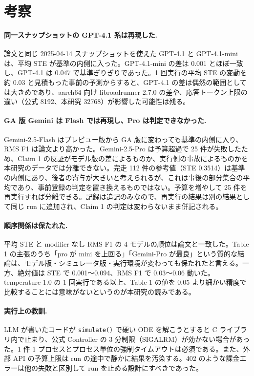 \documentclass{article}
\providecommand{\unverified}[1]{#1}
\begin{document}


\section{考察}
\label{sec:discussion}
\paragraph{同一スナップショットの GPT-4.1 系は再現した.}
論文と同じ 2025-04-14 スナップショットを使えた GPT-4.1 と GPT-4.1-mini は、平均 STE が基準の内側に入った。GPT-4.1-mini の差は 0.001 とほぼ一致し、GPT-4.1 は 0.047 で基準ぎりぎりであった。1 回実行の平均 STE の変動を約 0.03 と見積もった事前の予測からすると、GPT-4.1 の差は偶然の範囲としては大きめであり、aarch64 向け libroadrunner 2.7.0 の差や、応答トークン上限の違い（公式 8192、本研究 32768）が影響した可能性は残る。

\paragraph{GA 版 Gemini は Flash では再現し、Pro は判定できなかった.}
Gemini-2.5-Flash はプレビュー版から GA 版に変わっても基準の内側に入り、RMS F1 は論文より高かった。Gemini-2.5-Pro は予算超過で 25 件が失敗したため、Claim 1 の反証がモデル版の差によるものか、実行側の事故によるものかを本研究のデータでは分離できない。完走 112 件の参考値（STE \unverified{0.3514}）は基準の内側にあり、後者の寄与が大きいと考えられるが、これは事後の部分集合の平均であり、事前登録の判定を置き換えるものではない。予算を増やして 25 件を再実行すれば分離できる。記録は追記のみなので、再実行の結果は別の結果として同じ run に追加され、Claim 1 の判定は変わらないまま併記される。

\paragraph{順序関係は保たれた.}
平均 STE と modifier なし RMS F1 の 4 モデルの順位は論文と一致した。Table 1 の主張のうち「pro が mini を上回る」「Gemini-Pro が最良」という質的な結論は、モデル版・シミュレータ版・実行環境が変わっても保たれたと言える。一方、絶対値は STE で 0.001〜0.094、RMS F1 で 0.03〜0.06 動いた。temperature 1.0 の 1 回実行である以上、Table 1 の値を 0.05 より細かい精度で比較することには意味がないというのが本研究の読みである。

\paragraph{実行上の教訓.}
LLM が書いたコードが \texttt{simulate()} で硬い ODE を解こうとすると C ライブラリ内で止まり、公式 Controller の 3 分制限（SIGALRM）が効かない場合があった。1 件 1 プロセスとプロセス単位の強制タイムアウトは必須である。また、外部 API の予算上限は run の途中で静かに結果を汚染する。402 のような課金エラーは他の失敗と区別して run を止める設計にすべきであった。
\end{document}
